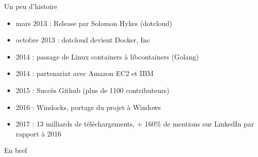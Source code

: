 \begin{frame}{Un peu d'histoire}
    \begin{itemize}
        \item mars 2013 : Release par Solomon Hykes (dotcloud)
        \item octobre 2013 : dotcloud devient Docker, Inc
        \item 2014 : passage de Linux containers à libcontainers (Golang)
        \item 2014 : partenariat avec Amazon EC2 et IBM
        \item 2015 : Succès Github (plus de 1100 contributeurs)
        \item 2016 : Windocks, portage du projet à Windows 
        \item 2017 : 13 milliards de téléchargements, + 160\% de mentions sur LinkedIn par rapport à 2016
    \end{itemize}
\end{frame}

\begin{frame}{En bref}
    
\end{frame}